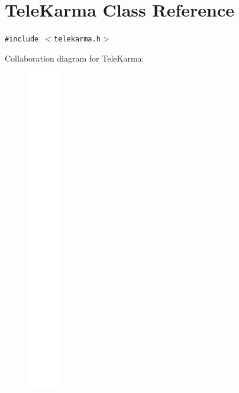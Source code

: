 \hypertarget{classTeleKarma}{
\section{TeleKarma Class Reference}
\label{classTeleKarma}
}
{\tt \#include $<$telekarma.h$>$}

Collaboration diagram for TeleKarma:\nopagebreak
\begin{figure}[H]
\begin{center}
\leavevmode
\includegraphics[height=400pt]{classTeleKarma__coll__graph}
\end{center}
\end{figure}
